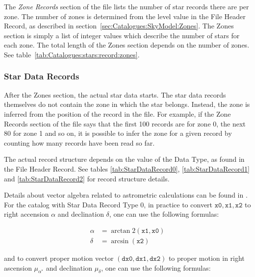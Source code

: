 The \emph{Zone Records} section of the file lists the number of star
records there are per zone. The number of zones is determined from the
level value in the File Header Record, as described in
section~\ref{sec:Catalogues:SkyModel:Zones}. The Zones section is
simply a list of integer values which describe the number of stars for
each zone. The total length of the Zones section depends on the number
of zones. See table~\ref{tab:Catalogues:stars:record:zones}.


\subsubsection{Star Data Records}%
\label{sec:Catalogues:stars:record:data}

After the Zones section, the actual star data starts. The star data
records themselves do not contain the zone in which the star belongs.
Instead, the zone is inferred from the position of the record in the
file. For example, if the Zone Records section of the file says that the
first 100 records are for zone 0, the next 80 for zone 1 and so on, it
is possible to infer the zone for a given record by counting how many
records have been read so far.

The actual record structure depends on the value of the Data Type, as
found in the File Header Record.
See tables 
\ref{tab:StarDataRecord0}, \ref{tab:StarDataRecord1} and \ref{tab:StarDataRecord2}
for record structure details.

Details about vector algebra related to astrometric calculations can be 
found in \citep{2012asas.book.....V}. For the catalog with Star Data Record 
Type 0, in practice to convert $\mathtt{x0}, \mathtt{x1}, \mathtt{x2}$ to 
right accension $\alpha$ and declination $\delta$, one can use the following 
formulas:

\begin{equation}
\begin{aligned}
\alpha &= \arctan2(\mathtt{x1}, \mathtt{x0})\\
\delta &= \arcsin(\mathtt{x2})
\end{aligned}
\end{equation}

and to convert proper motion vector $(\mathtt{dx0}, \mathtt{dx1}, \mathtt{dx2})$ to 
proper motion in right ascension $\mu_{\alpha^*}$ and declination $\mu_{\delta}$, 
one can use the following formulas:

